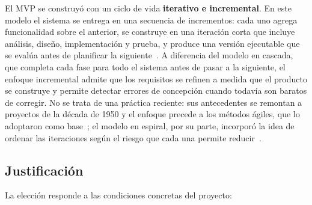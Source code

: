 El MVP se construyó con un ciclo de vida \textbf{iterativo e incremental}. En este modelo el sistema se entrega en una secuencia de incrementos: cada uno agrega funcionalidad sobre el anterior, se construye en una iteración corta que incluye análisis, diseño, implementación y prueba, y produce una versión ejecutable que se evalúa antes de planificar la siguiente~\parencite{Sommerville2016}. A diferencia del modelo en cascada, que completa cada fase para todo el sistema antes de pasar a la siguiente, el enfoque incremental admite que los requisitos se refinen a medida que el producto se construye y permite detectar errores de concepción cuando todavía son baratos de corregir. No se trata de una práctica reciente: sus antecedentes se remontan a proyectos de la década de 1950 y el enfoque precede a los métodos ágiles, que lo adoptaron como base~\parencite{LarmanBasili2003}; el modelo en espiral, por su parte, incorporó la idea de ordenar las iteraciones según el riesgo que cada una permite reducir~\parencite{Boehm1988}.

\subsection{Justificación}

La elección responde a las condiciones concretas del proyecto:

